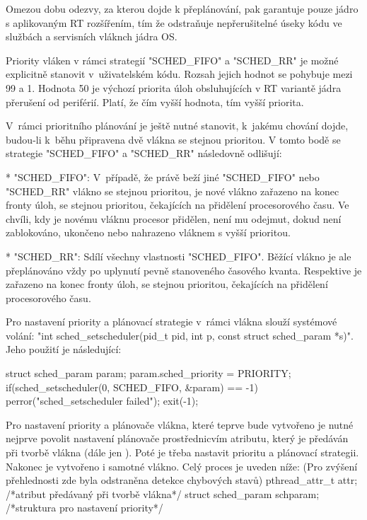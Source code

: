 Omezou dobu odezvy, za kterou dojde k přeplánování, pak garantuje pouze jádro s aplikovaným RT rozšířením, tím že odstraňuje nepřerušitelné úseky kódu ve službách a servisních vláknch jádra OS.

Priority vláken v rámci strategií "SCHED_FIFO" a "SCHED_RR" je možné explicitně stanovit v~uživatelském kódu. Rozsah jejich hodnot se pohybuje mezi 99 a 1. Hodnota 50 je výchozí priorita úloh obsluhujících v RT variantě jádra přerušení od periférií. Platí, že čím vyšší hodnota, tím vyšší priorita. 

V~rámci prioritního plánování je ještě nutné stanovit, k~jakému chování dojde, budou-li k~běhu připravena dvě vlákna se stejnou prioritou. V tomto bodě se strategie "SCHED_FIFO" a "SCHED_RR" následovně odlišují: 


\begitems 

* "SCHED_FIFO":  V~případě, že právě beží jiné "SCHED_FIFO" nebo "SCHED_RR" vlákno se stejnou prioritou, je nové vlákno zařazeno na konec fronty úloh, se stejnou prioritou, čekajících na přidělení procesorového času. Ve chvíli, kdy je novému vláknu procesor přidělen, není mu odejmut, dokud není zablokováno, ukončeno nebo nahrazeno vláknem s vyšší prioritou. 

* "SCHED_RR": Sdílí všechny vlastnosti "SCHED_FIFO". Běžící vlákno je ale přeplánováno vždy po uplynutí pevně stanoveného časového kvanta. Respektive je zařazeno na konec fronty úloh, se stejnou prioritou, čekajících na přidělení procesorového času.
\enditems

Pro nastavení priority a plánovací strategie v~rámci vlákna slouží systémové volání: "int sched_setscheduler(pid_t pid, int p, const struct sched_param *s)". Jeho použití je následující:

\begtt
struct sched_param param;
param.sched_priority = PRIORITY;
if(sched_setscheduler(0, SCHED_FIFO, &param) == -1) {
     perror("sched_setscheduler failed");
     exit(-1);
}\endtt

Pro nastavení priority a plánovače vlákna, které teprve bude vytvořeno je nutné nejprve povolit nastavení plánovače prostřednicvím atributu, který je předáván při tvorbě vlákna (dále jen ). Poté je třeba nastavit prioritu a plánovací strategii. Nakonec je vytvořeno i samotné vlákno. Celý proces je uveden níže: (Pro zvýšení přehlednosti zde byla odstraněna detekce chybových stavů)
\begtt
	pthread_attr_t attr; 	       /*atribut předávaný při tvorbě vlákna*/
	struct sched_param schparam;	/*struktura pro nastavení priority*/

